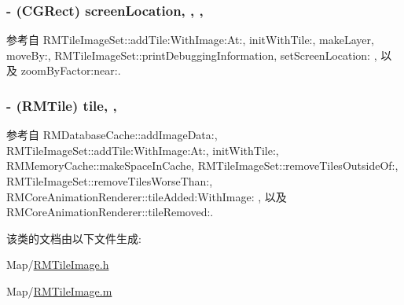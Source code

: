 \hypertarget{interface_r_m_tile_image_aedf8f108ad32b37c9eb7df5895134695}{
\subsubsection[{screen\-Location}]{\setlength{\rightskip}{0pt plus 5cm}-\/ (C\-G\-Rect) screen\-Location\hspace{0.3cm}{\ttfamily [read]}, {\ttfamily [write]}, {\ttfamily [atomic]}, {\ttfamily [assign]}}}\label{interface_r_m_tile_image_aedf8f108ad32b37c9eb7df5895134695}


参考自 R\-M\-Tile\-Image\-Set\-::add\-Tile\-:\-With\-Image\-:\-At\-:, init\-With\-Tile\-:, make\-Layer, move\-By\-:, R\-M\-Tile\-Image\-Set\-::print\-Debugging\-Information, set\-Screen\-Location\-: , 以及 zoom\-By\-Factor\-:near\-:.

\hypertarget{interface_r_m_tile_image_a084a28ae27d9153ec2acd5505c614505}{
\subsubsection[{tile}]{\setlength{\rightskip}{0pt plus 5cm}-\/ ({\bf R\-M\-Tile}) tile\hspace{0.3cm}{\ttfamily [read]}, {\ttfamily [atomic]}, {\ttfamily [assign]}}}\label{interface_r_m_tile_image_a084a28ae27d9153ec2acd5505c614505}


参考自 R\-M\-Database\-Cache\-::add\-Image\-Data\-:, R\-M\-Tile\-Image\-Set\-::add\-Tile\-:\-With\-Image\-:\-At\-:, init\-With\-Tile\-:, R\-M\-Memory\-Cache\-::make\-Space\-In\-Cache, R\-M\-Tile\-Image\-Set\-::remove\-Tiles\-Outside\-Of\-:, R\-M\-Tile\-Image\-Set\-::remove\-Tiles\-Worse\-Than\-:, R\-M\-Core\-Animation\-Renderer\-::tile\-Added\-:\-With\-Image\-: , 以及 R\-M\-Core\-Animation\-Renderer\-::tile\-Removed\-:.



该类的文档由以下文件生成\-:\begin{DoxyCompactItemize}
\item 
Map/\hyperlink{_r_m_tile_image_8h}{R\-M\-Tile\-Image.\-h}\item 
Map/\hyperlink{_r_m_tile_image_8m}{R\-M\-Tile\-Image.\-m}\end{DoxyCompactItemize}
